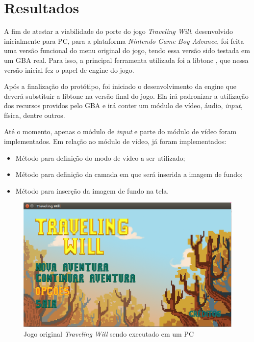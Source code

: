 \chapter[Resultados]{Resultados}

A fim de atestar a viabilidade do porte do jogo \textit{Traveling Will}, desenvolvido inicialmente para PC, para a plataforma \textit{Nintendo Game Boy Advance}, foi feita uma versão funcional do menu original do jogo, tendo essa versão sido testada em um GBA real. Para isso, a principal ferramenta utilizada foi a libtonc \cite{libtonc}, que nessa versão inicial fez o papel de engine do jogo.

Após a finalização do protótipo, foi iniciado o desenvolvimento da engine que deverá substituir a libtonc na versão final do jogo. Ela irá padronizar a utilização dos recursos providos pelo GBA e irá conter um módulo de vídeo, áudio, \textit{input}, física, dentre outros.

Até o momento, apenas o módulo de \textit{input} e parte do módulo de vídeo foram implementados. Em relação ao módulo de vídeo, já foram implementados:

\begin{itemize}

\item Método para definição do modo de vídeo a ser utilizado;
\item Método para definição da camada em que será inserida a imagem de fundo;
\item Método para inserção da imagem de fundo na tela.

\end{itemize}

\begin{figure}[H]
 \centering \includegraphics[keepaspectratio=true,scale=0.6]{figuras/tw-original-1.eps}
   \caption{Jogo original \textit{Traveling Will} sendo executado em um PC}
   \label{tw-original-1}
\end{figure}

